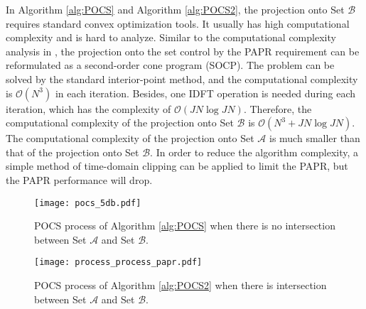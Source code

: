 \documentclass[paper]{ieice}
\begin{document}
In Algorithm \ref{alg:POCS} and Algorithm \ref{alg:POCS2}, the projection onto Set $\mathcal{B}$ requires standard convex optimization tools.  It usually has high computational complexity and is hard to analyze. Similar to the computational complexity analysis in \cite{wang2011optimized,ni2015joint}, the projection onto the set control by the PAPR requirement can be reformulated as a second-order cone program (SOCP). The problem can be solved by the standard
interior-point method, and the computational complexity is $\mathcal{O}(N^3)$ in each
iteration. Besides, one IDFT operation is needed during each iteration, which has the complexity of $\mathcal{O}(JN \log JN)$.
Therefore, the computational complexity of the projection onto Set $\mathcal{B}$ is $\mathcal{O}(N^3 + JN \log JN)$. The computational complexity of the projection onto Set $\mathcal{A}$ is much smaller than that of the projection onto Set $\mathcal{B}$.  In order to reduce the algorithm complexity, a simple method of time-domain clipping can be applied to limit the PAPR, but the PAPR performance will drop.


\begin{figure}[t]
\begin{center}
\texttt{[image: pocs\_5db.pdf]}
\end{center}
\caption{POCS process of Algorithm \ref{alg:POCS} when there is no intersection between Set $\mathcal{A}$ and Set $\mathcal{B}$.}
\label{fig:pocs_no_interection}
\end{figure}




\begin{figure}[t]
	\begin{center}
	\texttt{[image: process\_process\_papr.pdf]}
      \end{center}
	\caption{POCS process of Algorithm \ref{alg:POCS2} when there is intersection between Set $\mathcal{A}$ and Set $\mathcal{B}$.}
	\label{fig:pocs_nointersection_papr}
\end{figure}
\end{document}
